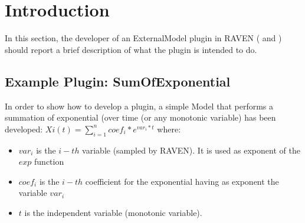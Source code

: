 \section{Introduction}
\label{sec:Introduction}
In this section, the developer of an ExternalModel plugin in RAVEN ( \cite{RAVEN} and \cite{RAVENtheoryMan}) should
report a brief description of what the plugin is intended to do.

\subsection{Example Plugin: SumOfExponential}
 In order to show how to develop a plugin, a simple Model that performs a summation
 of exponential (over time (or any monotonic variable) has been developed:
 \newline
 \begin{math}
        Xi(t)=\sum_{i=1}^{n} coef_i*e^{var_i*t}
  \end{math}
  \newline
 where:
 \begin{itemize}
    \item $var_i$ is the $i-th$ variable (sampled by RAVEN). It is used as exponent of the 
            $exp$ function
   \item $coef_i$ is the $i-th$  coefficient for the exponential having as exponent the  
            variable $var_i$
   \item $t$ is the independent variable (monotonic variable).
 \end{itemize}

